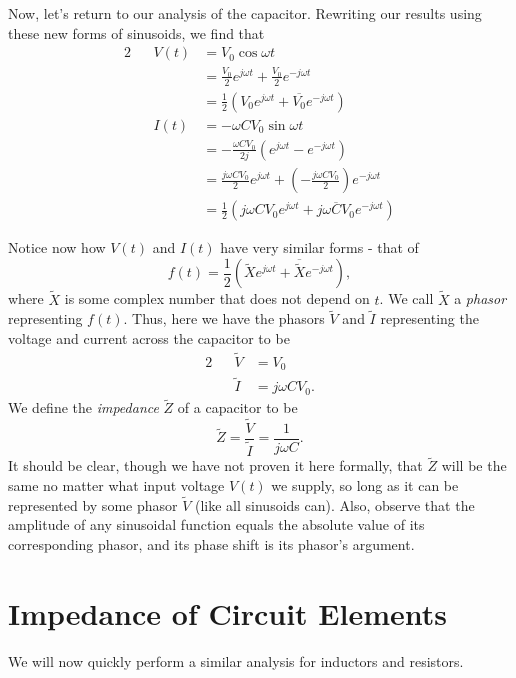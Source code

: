 \documentclass[letterpaper]{article}
\theoremstyle{remark}
\renewcommand{\tilde}[1]{\widetilde{#1}}
\newcommand{\eqn}[1]{\begin{alignat*}{2}#1\end{alignat*}}
\begin{document}
Now, let's return to our analysis of the capacitor. Rewriting our results using these new forms of sinusoids, we find that
\eqn{
    && V(t) &= V_0\cos{\omega t} \\
    &&&= \frac{V_0}{2} e^{j\omega t} + \frac{V_0}{2} e^{-j\omega t} \\
    &&&= \frac{1}{2} \left( V_0 e^{j\omega t} + \overline{V_0} e^{-j\omega t} \right) \\
    && I(t) &= -\omega C V_0 \sin{\omega t} \\
    &&&= -\frac{\omega C V_0}{2j} (e^{j\omega t} - e^{-j\omega t}) \\
    &&&= \frac{j\omega C V_0}{2} e^{j\omega t} + (-\frac{j\omega C V_0}{2}) e^{-j\omega t} \\
    &&&= \frac{1}{2} \left(j \omega C V_0 e^{j\omega t} + \overline{j \omega C V_0} e^{-j\omega t} \right)
}

Notice now how $V(t)$ and $I(t)$ have very similar forms - that of
\[
    f(t) = \frac{1}{2} \left(\tilde{X}e^{j\omega t} + \overline{\tilde{X}} e^{-j\omega t} \right),
\]
where $\tilde{X}$ is some complex number that does not depend on $t$. We call $\tilde{X}$ a \emph{phasor} representing $f(t)$. Thus, here we have the phasors $\tilde{V}$ and $\tilde{I}$ representing the voltage and current across the capacitor to be
\eqn{
    && \tilde{V} &= V_0 \\
    && \tilde{I} &= j\omega C V_0.
}
We define the \emph{impedance} $\tilde{Z}$ of a capacitor to be
\[
    \tilde{Z} = \frac{\tilde{V}}{\tilde{I}} = \frac{1}{j\omega C}.
\]
It should be clear, though we have not proven it here formally, that $\tilde{Z}$ will be the same no matter what input voltage $V(t)$ we supply, so long as it can be represented by some phasor $\tilde{V}$ (like all sinusoids can). Also, observe that the amplitude of any sinusoidal function equals the absolute value of its corresponding phasor, and its phase shift is its phasor's argument.

\section{Impedance of Circuit Elements}
We will now quickly perform a similar analysis for inductors and resistors.
\end{document}
